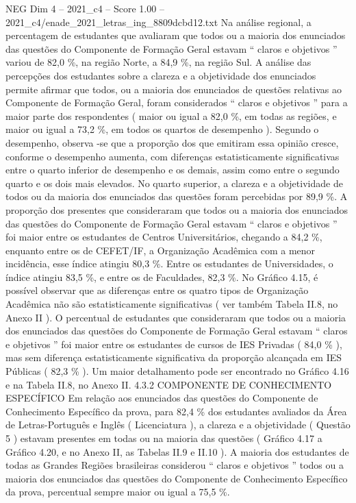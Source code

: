 \begin{textsample}{NEG Dim 4 – 2021\_c4 – Score 1.00 – 2021\_c4/enade\_2021\_letras\_ing\_8809dcbd12.txt}
Na análise regional, a percentagem de estudantes que avaliaram que todos ou a maioria dos enunciados das questões do Componente de Formação Geral estavam “ claros e objetivos ” variou de 82,0 \%, na região Norte, a 84,9 \%, na região Sul.
A análise das percepções dos estudantes sobre a clareza e a objetividade dos enunciados permite afirmar que todos, ou a maioria dos enunciados de questões relativas ao Componente de Formação Geral, foram considerados “ claros e objetivos ” para a maior parte dos respondentes ( maior ou igual a 82,0 \%, em todas as regiões, e maior ou igual a 73,2 \%, em todos os quartos de desempenho ).
Segundo o desempenho, observa -se que a proporção dos que emitiram essa opinião cresce, conforme o desempenho aumenta, com diferenças estatisticamente significativas entre o quarto inferior de desempenho e os demais, assim como entre o segundo quarto e os dois mais elevados.
No quarto superior, a clareza e a objetividade de todos ou da maioria dos enunciados das questões foram percebidas por 89,9 \%.
A proporção dos presentes que consideraram que todos ou a maioria dos enunciados das questões do Componente de Formação Geral estavam “ claros e objetivos ” foi maior entre os estudantes de Centros Universitários, chegando a 84,2 \%, enquanto entre os de CEFET/IF, a Organização Acadêmica com a menor incidência, esse índice atingiu 80,3 \%.
Entre os estudantes de Universidades, o índice atingiu 83,5 \%, e entre os de Faculdades, 82,3 \%.
No Gráfico 4.15, é possível observar que as diferenças entre os quatro tipos de Organização Acadêmica não são estatisticamente significativas ( ver também Tabela II.8, no Anexo II ).
O percentual de estudantes que consideraram que todos ou a maioria dos enunciados das questões do Componente de Formação Geral estavam “ claros e objetivos ” foi maior entre os estudantes de cursos de IES Privadas ( 84,0 \% ), mas sem diferença estatisticamente significativa da proporção alcançada em IES Públicas ( 82,3 \% ).
Um maior detalhamento pode ser encontrado no Gráfico 4.16 e na Tabela II.8, no Anexo II. 4.3.2 COMPONENTE DE CONHECIMENTO ESPECÍFICO Em relação aos enunciados das questões do Componente de Conhecimento Específico da prova, para 82,4 \% dos estudantes avaliados da Área de Letras-Português e Inglês ( Licenciatura ), a clareza e a objetividade ( Questão 5 ) estavam presentes em todas ou na maioria das questões ( Gráfico 4.17 a Gráfico 4.20, e no Anexo II, as Tabelas II.9 e II.10 ).
A maioria dos estudantes de todas as Grandes Regiões brasileiras considerou “ claros e objetivos ” todos ou a maioria dos enunciados das questões do Componente de Conhecimento Específico da prova, percentual sempre maior ou igual a 75,5 \%.

\end{textsample}
